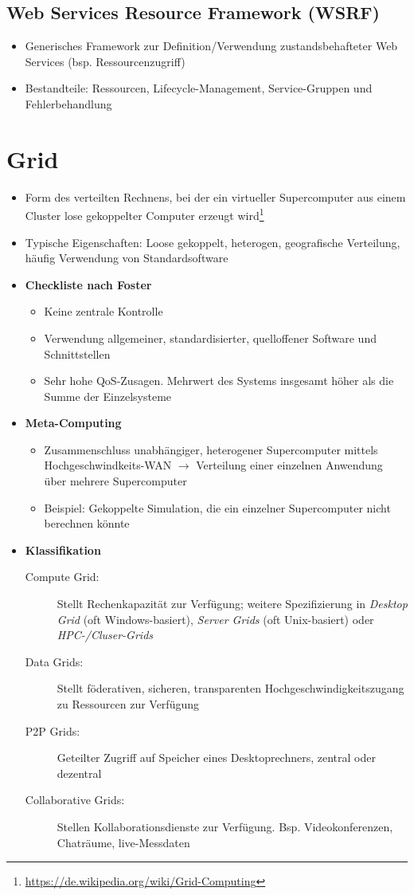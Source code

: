 \subsection{Web Services Resource Framework (WSRF)}
\begin{itemize}
	\item Generisches Framework zur Definition/Verwendung zustandsbehafteter Web Services (bsp. Ressourcenzugriff)
	\item Bestandteile: Ressourcen, Lifecycle-Management, Service-Gruppen und Fehlerbehandlung
\end{itemize}



\section{Grid}
\begin{itemize}
	\item Form des verteilten Rechnens, bei der ein virtueller Supercomputer aus einem Cluster lose gekoppelter Computer erzeugt wird\footnote{\url{https://de.wikipedia.org/wiki/Grid-Computing}}
	\item Typische Eigenschaften: Loose gekoppelt, heterogen, geografische Verteilung, häufig Verwendung von Standardsoftware
	\item \textbf{Checkliste nach Foster}
	\begin{itemize}
		\item Keine zentrale Kontrolle
		\item Verwendung allgemeiner, standardisierter, quelloffener Software und Schnittstellen
		\item Sehr hohe QoS-Zusagen. Mehrwert des Systems insgesamt höher als die Summe der Einzelsysteme 
	\end{itemize}
	\item \textbf{Meta-Computing}
	\begin{itemize}
		\item Zusammenschluss unabhängiger, heterogener Supercomputer mittels Hochgeschwindkeits-WAN \(\rightarrow\) Verteilung einer einzelnen Anwendung über mehrere Supercomputer
		\item Beispiel: Gekoppelte Simulation, die ein einzelner Supercomputer nicht berechnen könnte
	\end{itemize}
	\item \textbf{Klassifikation}
	\begin{description}
		\item[Compute Grid:] Stellt Rechenkapazität zur Verfügung; weitere Spezifizierung in \textit{Desktop Grid} (oft Windows-basiert), \textit{Server Grids} (oft Unix-basiert) oder \textit{HPC-/Cluser-Grids}
		\item[Data Grids:] Stellt föderativen, sicheren, transparenten Hochgeschwindigkeitszugang zu Ressourcen zur Verfügung 
		\item[P2P Grids:] Geteilter Zugriff auf Speicher eines Desktoprechners, zentral oder dezentral
		\item[Collaborative Grids:] Stellen Kollaborationsdienste zur Verfügung. Bsp. Videokonferenzen, Chaträume, live-Messdaten
	\end{description}
\end{itemize}


